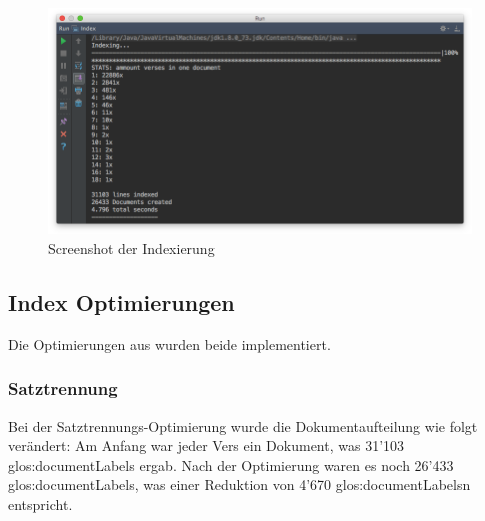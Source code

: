 \vfill
\begin{figure}[H]
	\centering
	\includegraphics[width=1.0\textwidth]{images/3-realization/indexing_screenshot.png}
	\caption{Screenshot der Indexierung}
\end{figure}


\newpage
\subsection{Index Optimierungen}

Die Optimierungen aus  wurden beide implementiert.

\subsubsection{Satztrennung}
Bei der Satztrennungs-Optimierung wurde die Dokumentaufteilung wie folgt verändert:
Am Anfang war jeder Vers ein Dokument, was 31'103 \glspl{glos:documentLabel} ergab.
Nach der Optimierung waren es noch 26'433 \glspl{glos:documentLabel}, was einer Reduktion von 4'670 \glspl{glos:documentLabel}n entspricht.

